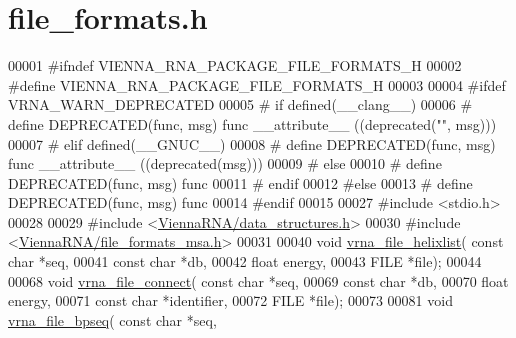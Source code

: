 \hypertarget{file__formats_8h_source}{}\section{file\+\_\+formats.\+h}
\label{file__formats_8h_source}

\begin{DoxyCode}
00001 \textcolor{preprocessor}{#ifndef VIENNA\_RNA\_PACKAGE\_FILE\_FORMATS\_H}
00002 \textcolor{preprocessor}{#define VIENNA\_RNA\_PACKAGE\_FILE\_FORMATS\_H}
00003 
00004 \textcolor{preprocessor}{#ifdef VRNA\_WARN\_DEPRECATED}
00005 \textcolor{preprocessor}{# if defined(\_\_clang\_\_)}
00006 \textcolor{preprocessor}{#  define DEPRECATED(func, msg) func \_\_attribute\_\_ ((deprecated("", msg)))}
00007 \textcolor{preprocessor}{# elif defined(\_\_GNUC\_\_)}
00008 \textcolor{preprocessor}{#  define DEPRECATED(func, msg) func \_\_attribute\_\_ ((deprecated(msg)))}
00009 \textcolor{preprocessor}{# else}
00010 \textcolor{preprocessor}{#  define DEPRECATED(func, msg) func}
00011 \textcolor{preprocessor}{# endif}
00012 \textcolor{preprocessor}{#else}
00013 \textcolor{preprocessor}{# define DEPRECATED(func, msg) func}
00014 \textcolor{preprocessor}{#endif}
00015 
00027 \textcolor{preprocessor}{#include <stdio.h>}
00028 
00029 \textcolor{preprocessor}{#include <\hyperlink{data__structures_8h}{ViennaRNA/data\_structures.h}>}
00030 \textcolor{preprocessor}{#include <\hyperlink{file__formats__msa_8h}{ViennaRNA/file\_formats\_msa.h}>}
00031 
00040 \textcolor{keywordtype}{void} \hyperlink{group__file__utils_gaaface7db12fadc3d271641c4515ab6e4}{vrna\_file\_helixlist}( \textcolor{keyword}{const} \textcolor{keywordtype}{char} *seq,
00041                           \textcolor{keyword}{const} \textcolor{keywordtype}{char} *db,
00042                           \textcolor{keywordtype}{float} energy,
00043                           FILE *file);
00044 
00068 \textcolor{keywordtype}{void} \hyperlink{group__file__utils_gab69682373ccca1e0e28cc967eec07745}{vrna\_file\_connect}( \textcolor{keyword}{const} \textcolor{keywordtype}{char} *seq,
00069                         \textcolor{keyword}{const} \textcolor{keywordtype}{char} *db,
00070                         \textcolor{keywordtype}{float} energy,
00071                         \textcolor{keyword}{const} \textcolor{keywordtype}{char} *identifier,
00072                         FILE *file);
00073 
00081 \textcolor{keywordtype}{void} \hyperlink{group__file__utils_ga9b462e6f202594af5d3fa56e280d633f}{vrna\_file\_bpseq}( \textcolor{keyword}{const} \textcolor{keywordtype}{char} *seq,

\end{DoxyCode}
